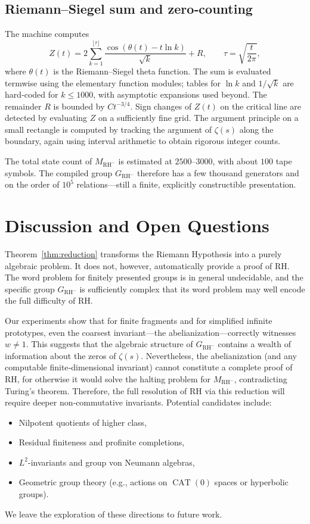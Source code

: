 \documentclass[11pt,a4paper]{article}
\begin{document}
\subsection{Riemann–Siegel sum and zero‑counting}
The machine computes
\[
Z(t) = 2\sum_{k=1}^{\lfloor \tau \rfloor} \frac{\cos(\theta(t) - t\ln k)}{\sqrt{k}} + R,\qquad \tau = \sqrt{\frac{t}{2\pi}},
\]
where \(\theta(t)\) is the Riemann–Siegel theta function. The sum is evaluated termwise using the elementary function modules; tables for \(\ln k\) and \(1/\sqrt{k}\) are hard‑coded for \(k \leq 1000\), with asymptotic expansions used beyond. The remainder \(R\) is bounded by \(C t^{-3/4}\). Sign changes of \(Z(t)\) on the critical line are detected by evaluating \(Z\) on a sufficiently fine grid. The argument principle on a small rectangle is computed by tracking the argument of \(\zeta(s)\) along the boundary, again using interval arithmetic to obtain rigorous integer counts.

The total state count of \(M_{\text{RH}^-}\) is estimated at $2500$--$3000$, with about $100$ tape symbols. The compiled group \(G_{\text{RH}^-}\) therefore has a few thousand generators and on the order of \(10^5\) relations—still a finite, explicitly constructible presentation.

\section{Discussion and Open Questions}

Theorem~\ref{thm:reduction} transforms the Riemann Hypothesis into a purely algebraic problem. It does not, however, automatically provide a proof of RH. The word problem for finitely presented groups is in general undecidable, and the specific group \(G_{\text{RH}^-}\) is sufficiently complex that its word problem may well encode the full difficulty of RH.

Our experiments show that for finite fragments and for simplified infinite prototypes, even the coarsest invariant—the abelianization—correctly witnesses \(w \neq 1\). This suggests that the algebraic structure of \(G_{\text{RH}^-}\) contains a wealth of information about the zeros of \(\zeta(s)\). Nevertheless, the abelianization (and any computable finite‑dimensional invariant) cannot constitute a complete proof of RH, for otherwise it would solve the halting problem for \(M_{\text{RH}^-}\), contradicting Turing's theorem. Therefore, the full resolution of RH via this reduction will require deeper non‑commutative invariants. Potential candidates include:
\begin{itemize}
    \item Nilpotent quotients of higher class,
    \item Residual finiteness and profinite completions,
    \item \(L^2\)-invariants and group von Neumann algebras,
    \item Geometric group theory (e.g., actions on \(\operatorname{CAT}(0)\) spaces or hyperbolic groups).
\end{itemize}
We leave the exploration of these directions to future work.
\end{document}
